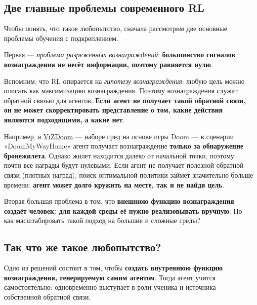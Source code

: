 \documentclass[11pt,a4paper]{article}
\begin{document}
\subsection{Две главные проблемы современного RL}\label{two-major-problems-in-modern-rl}

Чтобы понять, что такое любопытство, сначала рассмотрим две основные проблемы обучения с подкреплением.

Первая --- \emph{проблема разреженных вознаграждений}: \textbf{большинство сигналов вознаграждения не несёт информации, поэтому равняется нулю}.

Вспомним, что RL опирается на \emph{гипотезу вознаграждения}: любую цель можно описать как максимизацию вознаграждения. Поэтому вознаграждения служат обратной связью для агентов. \textbf{Если агент не получает такой обратной связи, он не может скорректировать представление о том, какие действия являются подходящими, а какие нет}.


Например, в \href{https://vizdoom.cs.put.edu.pl/}{ViZDoom} --- наборе сред на основе игры Doom --- в сценарии «DoomMyWayHome» агент получает вознаграждение \textbf{только за обнаружение бронежилета}. Однако жилет находится далеко от начальной точки, поэтому почти все награды будут нулевыми. Если агент не получает полезной обратной связи (плотных наград), поиск оптимальной политики займёт значительно больше времени: \textbf{агент может долго кружить на месте, так и не найдя цель}.


Вторая большая проблема в том, что \textbf{внешнюю функцию вознаграждения создаёт человек: для каждой среды её нужно реализовывать вручную}. Но как масштабировать такой подход на большие и сложные среды?

\subsection{Так что же такое любопытство?}\label{so-what-is-curiosity}

Одно из решений состоит в том, чтобы \textbf{создать внутреннюю функцию вознаграждения, генерируемую самим агентом}. Тогда агент учится самостоятельно: одновременно выступает в роли ученика и источника собственной обратной связи.
\end{document}
